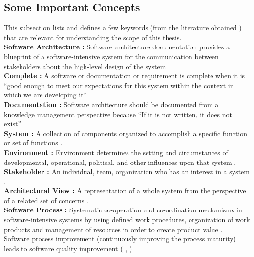 \subsection{Some Important Concepts}
\indent This subsection lists and defines a few keywords (from the literature obtained ) that are relevant for understanding the scope of this thesis.
\\\indent \textbf{Software Architecture : } Software architecture documentation provides a blueprint of a software-intensive system for the communication between stakeholders about the high-level design of the system \cite{6923128}
\newline
\\\indent \textbf{Complete : } A software or documentation or requirement is complete when it is \enquote{good enough to meet our expectations for this system within the context in which we are developing it}  \cite{BachmannDocumentingSoftware2010}
\newline
\\\indent \textbf{Documentation : } Software architecture should be documented from a knowledge management perspective because \enquote{If it is not written, it does not exist} \cite{bab2009}
\newline
\\\indent \textbf{System : }A collection of components organized to accomplish a specific function or set of functions \cite{Standard2007}.
\newline
\\\indent \textbf{Environment : }Environment determines the setting and circumstances of developmental, operational, political, and other influences upon that system \cite{Standard2007}. 
\newline
\\\indent \textbf{Stakeholder : } An individual, team, organization who has an interest in a system \cite{Standard2007}.
\newline
\\\indent \textbf{Architectural View : } A representation of a whole system from the perspective of a related set of concerns \cite{Standard2007}.
\newline
\\\indent \textbf{Software Process : } Systematic co-operation and co-ordination mechanisms in software-intensive systems by using defined work procedures, organization of work products and management of resources in order to create product value \cite{munch2012software}.
\\\indent Software process improvement (continuously improving the process maturity) leads to software quality improvement ( \cite{Fuggeffa1988}, \cite{Lavallee2011} )


